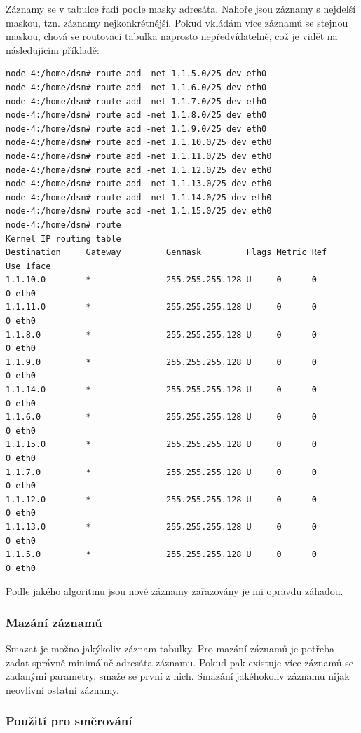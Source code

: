 Záznamy se v tabulce řadí podle masky adresáta. Nahoře jsou záznamy s nejdelší maskou, tzn. záznamy nejkonkrétnější. Pokud vkládám více záznamů se stejnou maskou, chová se routovací tabulka naprosto nepředvídatelně, což je vidět na následujícím příkladě:
\begin{verbatim}
node-4:/home/dsn# route add -net 1.1.5.0/25 dev eth0
node-4:/home/dsn# route add -net 1.1.6.0/25 dev eth0
node-4:/home/dsn# route add -net 1.1.7.0/25 dev eth0
node-4:/home/dsn# route add -net 1.1.8.0/25 dev eth0
node-4:/home/dsn# route add -net 1.1.9.0/25 dev eth0
node-4:/home/dsn# route add -net 1.1.10.0/25 dev eth0
node-4:/home/dsn# route add -net 1.1.11.0/25 dev eth0
node-4:/home/dsn# route add -net 1.1.12.0/25 dev eth0
node-4:/home/dsn# route add -net 1.1.13.0/25 dev eth0
node-4:/home/dsn# route add -net 1.1.14.0/25 dev eth0
node-4:/home/dsn# route add -net 1.1.15.0/25 dev eth0
node-4:/home/dsn# route
Kernel IP routing table
Destination     Gateway         Genmask         Flags Metric Ref    Use Iface
1.1.10.0        *               255.255.255.128 U     0      0        0 eth0
1.1.11.0        *               255.255.255.128 U     0      0        0 eth0
1.1.8.0         *               255.255.255.128 U     0      0        0 eth0
1.1.9.0         *               255.255.255.128 U     0      0        0 eth0
1.1.14.0        *               255.255.255.128 U     0      0        0 eth0
1.1.6.0         *               255.255.255.128 U     0      0        0 eth0
1.1.15.0        *               255.255.255.128 U     0      0        0 eth0
1.1.7.0         *               255.255.255.128 U     0      0        0 eth0
1.1.12.0        *               255.255.255.128 U     0      0        0 eth0
1.1.13.0        *               255.255.255.128 U     0      0        0 eth0
1.1.5.0         *               255.255.255.128 U     0      0        0 eth0
\end{verbatim}
Podle jakého algoritmu jsou nové záznamy zařazovány je mi opravdu záhadou.

\subsubsection{Mazání záznamů}

Smazat je možno jakýkoliv záznam tabulky. Pro mazání záznamů je potřeba zadat správně minimálně adresáta záznamu. Pokud pak existuje více záznamů se zadanými parametry, smaže se první z nich. Smazání jakéhokoliv záznamu nijak neovlivní ostatní záznamy.

\subsubsection{Použití pro směrování}\label{routTabulka_pouzitiPriSmerovani}

